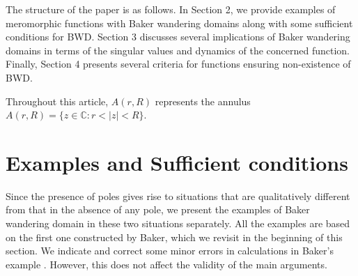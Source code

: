 \documentclass[11pt,a4paper]{article}
\begin{document}
\par The structure of the paper is as follows. In Section 2, we provide examples of meromorphic functions with Baker wandering domains along with some sufficient conditions for BWD. Section 3 discusses  several implications of Baker wandering domains in terms of the singular values and dynamics of the concerned function. Finally, Section 4 presents several criteria for functions ensuring non-existence of BWD. 
  \par Throughout this article, $A(r,R)$ represents the annulus $A(r, R)=\{z \in \mathbb{C}:r<|z|<R\}$. 
	\section{Examples and Sufficient conditions }
	Since the presence of poles gives rise to  situations that are qualitatively different from that in the absence of any pole, we present the examples   of Baker wandering domain in these two situations separately. All the examples are based on the first one constructed by Baker, which we revisit in the beginning of this section. We indicate and correct some minor errors in calculations in Baker’s  example \cite{Baker 1963, Baker 1984}. However, this does not affect the validity of the main arguments.
	
\end{document}
